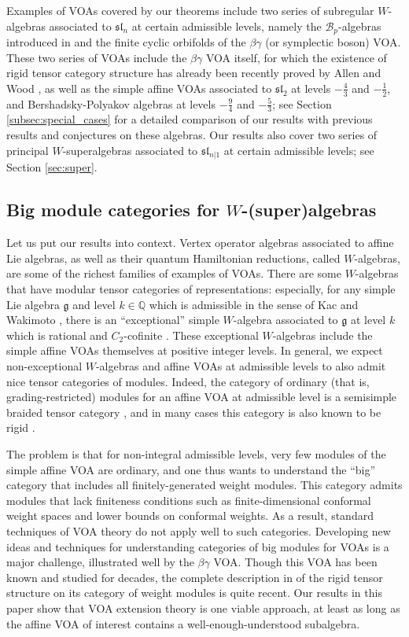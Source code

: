 \documentclass[11pt, reqno]{amsart}
\theoremstyle{definition}\newtheorem{defi}[thm]{Definition}
\theoremstyle{definition}\newtheorem{rem}[thm]{Remark}
\theoremstyle{definition}\newtheorem{exam}[thm]{Example}
\theoremstyle{definition}\newtheorem{assum}[thm]{Assumption}
\newcommand{\cB}{\mathcal{B}}
\newcommand{\QQ}{\mathbb{Q}}
\begin{document}
Examples of VOAs covered by our theorems include two series of subregular $W$-algebras associated to $\mathfrak{sl}_n$ at certain admissible levels, namely the $\cB_p$-algebras introduced in \cite{CRW} and the finite cyclic orbifolds of the $\beta\gamma$ (or symplectic boson) VOA. These two series of VOAs include the $\beta\gamma$ VOA itself, for which the existence of rigid tensor category structure has already been recently proved by Allen and Wood \cite{AW}, as well as the simple affine VOAs associated to $\mathfrak{sl}_2$ at levels $-\frac{4}{3}$ and $-\frac{1}{2}$, and Bershadsky-Polyakov algebras at levels $-\frac{9}{4}$ and $-\frac{5}{3}$; see Section \ref{subsec:special_cases} for a detailed comparison of our results with previous results and conjectures on these algebras. Our results also cover two series of principal $W$-superalgebras associated to $\mathfrak{sl}_{n\vert 1}$ at certain admissible levels; see Section \ref{sec:super}.

\subsection{Big module categories for \texorpdfstring{$W$}{W}-(super)algebras}


Let us put our results into context. Vertex operator algebras associated to affine Lie algebras, as well as their quantum Hamiltonian reductions, called $W$-algebras, are some of the richest families of examples of VOAs. There are some $W$-algebras that have modular tensor categories of representations: especially, for any simple Lie algebra $\mathfrak{g}$ and level $k\in\QQ$ which is admissible in the sense of Kac and Wakimoto \cite{KW}, there is an ``exceptional'' simple $W$-algebra associated to $\mathfrak{g}$ at level $k$ which is rational and $C_2$-cofinite \cite{Ar-C2, Ar-rat1, Ar-rat2, McR-rat}. These exceptional $W$-algebras include the simple affine VOAs themselves at positive integer levels. In general, we expect non-exceptional $W$-algebras and affine VOAs at admissible levels to also admit nice tensor categories of modules. Indeed, the category of ordinary (that is, grading-restricted) modules for an affine VOA at admissible level is a semisimple braided tensor category \cite{CHY}, and in many cases this category is also known to be rigid \cite{Cr2}. 

The problem is that for non-integral admissible levels, very few modules of the simple affine VOA  are ordinary, and one thus wants to understand the ``big'' category that includes all finitely-generated weight modules. This category admits modules that lack finiteness conditions such as finite-dimensional conformal weight spaces and lower bounds on conformal weights. As a result, standard techniques of VOA theory do not apply well to such categories. Developing new ideas and techniques for understanding categories of big modules for VOAs is a major challenge, illustrated well by the $\beta\gamma$ VOA. Though this VOA has been known and studied for decades, the complete description in \cite{AW} of the rigid tensor structure on its category of weight modules is quite recent. Our results in this paper show that VOA extension theory is one viable approach, at least as long as the affine VOA of interest contains a well-enough-understood subalgebra.
\end{document}
